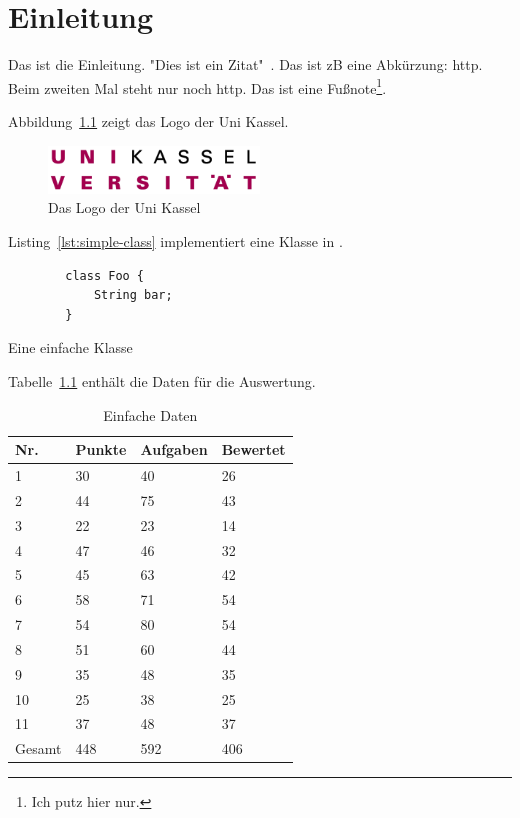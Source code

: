 \chapter{Einleitung}\label{ch:introduction}

Das ist die Einleitung.
"Dies ist ein Zitat"~\cite{dragon-book}.
Das ist \ac{zB} eine Abkürzung: \ac{http}.
Beim zweiten Mal steht nur noch \ac{http}.
Das ist eine Fußnote\footnote{Ich putz hier nur.}.

Abbildung~\ref{fig:uni-kassel-logo} zeigt das Logo der Uni Kassel.

\begin{figure}[htp] %
    \centering
    \includegraphics[width=0.5\textwidth]{images/Logo_UniKassel.png} %
    \caption{Das Logo der Uni Kassel}
    \label{fig:uni-kassel-logo}
\end{figure}

Listing~\ref{lst:simple-class} implementiert eine Klasse in .

\begin{listing}[htp]
    \begin{verbatim}
        class Foo {
            String bar;
        }
    \end{verbatim}
    \caption{Eine einfache Klasse}
    \label{lst:simple-class}
\end{listing}

Tabelle~\ref{tbl:evaluation-data} enthält die Daten für die Auswertung.

\begin{table}[htp]
    \centering
    \caption{Einfache Daten}
    \begin{tabular}{|l|l|l|l|}
    \hline
        Nr. & Punkte & Aufgaben & Bewertet \\
        \hline
        1  & 30 & 40 & 26 \\
        2  & 44 & 75 & 43 \\
        3  & 22 & 23 & 14 \\
        4  & 47 & 46 & 32 \\
        5  & 45 & 63 & 42 \\
        6  & 58 & 71 & 54 \\
        7  & 54 & 80 & 54 \\
        8  & 51 & 60 & 44 \\
        9  & 35 & 48 & 35 \\
        10 & 25 & 38 & 25 \\
        11 & 37 & 48 & 37 \\
        \hline
        Gesamt & 448 & 592 & 406 \\
        \hline
    \end{tabular}
    \label{tbl:evaluation-data}
\end{table}

